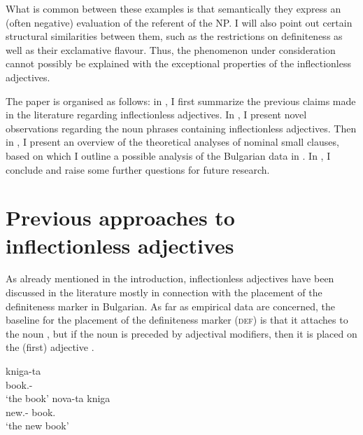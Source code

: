 \documentclass[output=paper]{langscibook}
\begin{document}
\noindent What is common between these examples is that semantically they express an (often negative) evaluation of the referent of the NP. I will also point out certain structural similarities between them, such as the restrictions on definiteness as well as their exclamative flavour. Thus, the phenomenon under consideration cannot possibly be explained with the exceptional properties of the inflectionless adjectives. 

The paper is organised as follows: in , I first summarize the previous claims made in the literature regarding inflectionless adjectives. In , I present novel observations regarding the noun phrases containing inflectionless adjectives. Then in , I present an overview of the theoretical analyses of nominal small clauses, based on which I outline a possible analysis of the Bulgarian data in . In , I conclude and raise some further questions for future research. 



\section{Previous approaches to inflectionless adjectives}\label{ge-sec-prev}

As already mentioned in the introduction, inflectionless adjectives have been discussed in the literature mostly in connection with the placement of the definiteness marker in Bulgarian. %
As far as empirical data are concerned, the baseline for the placement of the definiteness marker (\textsc{def}) is that it attaches to the noun 
, but if the noun is preceded by adjectival modifiers, then it is placed on the (first) adjective  \citep[for more details see][]{Halpern1995,Franks2001,EmbickNoyer2001,DostGribanova2006,Harizanov2014PhD,Harizanov2018,HarizanovGribanova2015,Adamson2019PhD}.

\ea 
\ea \label{ge-ex-n-def} 
\gll kniga-ta\\
book.\F{}-\Def{}\\
\glt `the book'
\ex \label{ge-ex-adj-def} 
\gll nova-ta kniga\\
new.\F{}-\Def{} book.\F{}\\
\glt `the new book'
\z
\z
	
\end{document}
